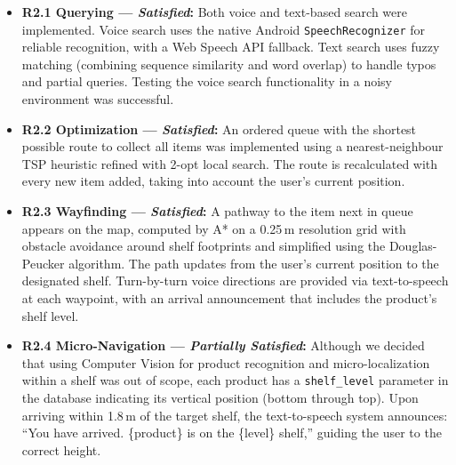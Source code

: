 \documentclass[12pt,a4paper]{article}
\begin{document}
\begin{itemize}
    \item \textbf{R2.1 Querying --- \textit{Satisfied}:}
    Both voice and text-based search were implemented. Voice search uses the native Android \texttt{SpeechRecognizer} for reliable recognition, with a Web Speech API fallback. Text search uses fuzzy matching (combining sequence similarity and word overlap) to handle typos and partial queries. Testing the voice search functionality in a noisy environment was successful.

    \item \textbf{R2.2 Optimization --- \textit{Satisfied}:}
    An ordered queue with the shortest possible route to collect all items was implemented using a nearest-neighbour TSP heuristic refined with 2-opt local search. The route is recalculated with every new item added, taking into account the user's current position.

    \item \textbf{R2.3 Wayfinding --- \textit{Satisfied}:}
    A pathway to the item next in queue appears on the map, computed by A* on a 0.25\,m resolution grid with obstacle avoidance around shelf footprints and simplified using the Douglas-Peucker algorithm. The path updates from the user's current position to the designated shelf. Turn-by-turn voice directions are provided via text-to-speech at each waypoint, with an arrival announcement that includes the product's shelf level.

    \item \textbf{R2.4 Micro-Navigation --- \textit{Partially Satisfied}:}
    Although we decided that using Computer Vision for product recognition and micro-localization within a shelf was out of scope, each product has a \texttt{shelf\_level} parameter in the database indicating its vertical position (bottom through top). Upon arriving within 1.8\,m of the target shelf, the text-to-speech system announces: ``You have arrived. \{product\} is on the \{level\} shelf,'' guiding the user to the correct height.
\end{itemize}
\end{document}
